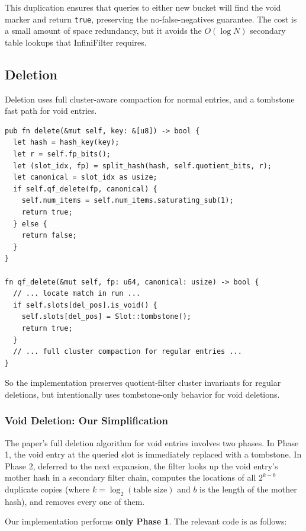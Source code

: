 This duplication ensures that queries to either new bucket will find the void marker and return \texttt{true}, preserving the no-false-negatives guarantee. The cost is a small amount of space redundancy, but it avoids the $O(\log N)$ secondary table lookups that InfiniFilter requires.

\subsection{Deletion}

Deletion uses full cluster-aware compaction for normal entries, and a tombstone fast path for void entries.

\begin{lstlisting}[caption={Deletion path in our Rust implementation}]
pub fn delete(&mut self, key: &[u8]) -> bool {
  let hash = hash_key(key);
  let r = self.fp_bits();
  let (slot_idx, fp) = split_hash(hash, self.quotient_bits, r);
  let canonical = slot_idx as usize;
  if self.qf_delete(fp, canonical) {
    self.num_items = self.num_items.saturating_sub(1);
    return true;
  } else {
    return false;
  }
}

fn qf_delete(&mut self, fp: u64, canonical: usize) -> bool {
  // ... locate match in run ...
  if self.slots[del_pos].is_void() {
    self.slots[del_pos] = Slot::tombstone();
    return true;
  }
  // ... full cluster compaction for regular entries ...
}
\end{lstlisting}

So the implementation preserves quotient-filter cluster invariants for regular deletions, but intentionally uses tombstone-only behavior for void deletions.

\subsubsection{Void Deletion: Our Simplification}
\label{sec:void-delete-tradeoff}

The paper's full deletion algorithm for void entries involves two phases. In Phase 1, the void entry at the queried slot is immediately replaced with a tombstone. In Phase 2, deferred to the next expansion, the filter looks up the void entry's mother hash in a secondary filter chain, computes the locations of all $2^{k-b}$ duplicate copies (where $k = \log_2(\text{table size})$ and $b$ is the length of the mother hash), and removes every one of them.

Our implementation performs \textbf{only Phase 1}. The relevant code is as follows:

